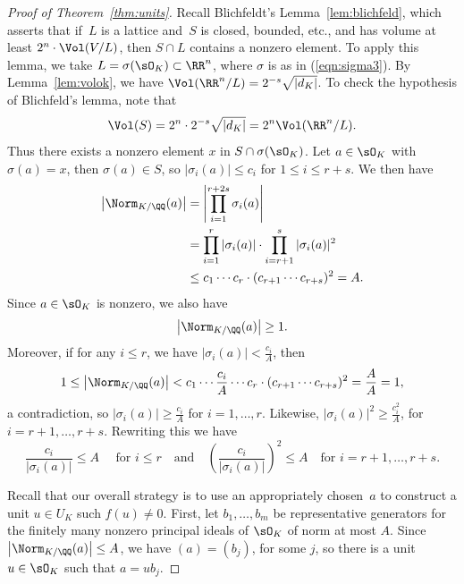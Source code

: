\begin{proof}[Proof of Theorem~\ref{thm:units}]
  Recall Blichfeldt's Lemma~\ref{lem:blichfeld}, which asserts
  that if~$L$ is a lattice and~$S$ is closed, bounded, etc., and has volume
  at least $2^n\cdot \Vol(V/L)$, then $S\cap L$ contains a nonzero element.
  To apply this lemma, we take $L=\sigma(\sO_K)\subset \RR^n$, where $\sigma$
  is as in (\ref{eqn:sigma3}). By Lemma~\ref{lem:volok}, we have
  $\Vol(\RR^n/L) = 2^{-s}\sqrt{|d_K|}$. To check the hypothesis of
  Blichfeld's lemma, note that
  \[
    \Vol(S) = 2^n \cdot 2^{-s} \sqrt{|d_K|} = 2^n \Vol(\RR^n/L).
  \]
  Thus there exists a nonzero element $x$ in $S\cap \sigma(\sO_K)$.
  Let $a\in \sO_K$ with $\sigma(a)=x$, then $\sigma(a)\in S$, so
  $|\sigma_i(a)|\leq c_i$ for $1\leq i\leq r+s$. We then have
  \begin{align*}
    \left|\Norm_{K/\QQ}(a)\right|
    &= \left|\prod_{i=1}^{r+2s} \sigma_i(a)\right|
    \\
    &= \prod_{i=1}^r |\sigma_i(a)|\cdot \prod_{i=r+1}^s|\sigma_i(a)|^2
    \\
    &\leq c_1\cdots c_r\cdot (c_{r+1}\cdots c_{r+s})^2 = A.
  \end{align*}
  Since $a\in \sO_K$ is nonzero, we also have
  \[
    \left|\Norm_{K/\QQ}(a)\right|\geq 1.
  \]
  Moreover, if for any $i\leq r$, we have $|\sigma_i(a)|< \frac{c_i}{A}$, then
  \[
    1
    \leq \left|\Norm_{K/\QQ}(a)\right|
    < c_1\cdots \frac{c_i}{A}\cdots c_r \cdot (c_{r+1}\cdots c_{r+s})^2
    = \frac{A}{A} = 1,
  \]
  a contradiction, so $|\sigma_i(a)|\geq \frac{c_i}{A}$ for $i=1,\dots, r$.
  Likewise, $|\sigma_i(a)|^2 \geq \frac{c_i^2}{A}$, for $i=r+1,\dots, r+s$.
  Rewriting this we have
  \begin{equation}\label{eqn:cisigbound}
    \frac{c_i}{|\sigma_i(a)|}\leq A\quad\text{ for }i\leq r
    \quad\text{and}\quad
    \left(\frac{c_i}{|\sigma_i(a)|}\right)^2
    \leq A\quad\text{for } i=r+1,\dots, r+s.
  \end{equation}
  
  Recall that our overall strategy is to use an appropriately chosen~$a$
  to construct a unit $u\in U_K$ such $f(u)\neq 0$.  First, let
  $b_1,\dots, b_m$ be representative generators for the finitely many
  nonzero principal ideals of $\sO_K$ of norm at most $A$.  Since
  $\left|\Norm_{K/\QQ}(a)\right|\leq A$, we have $(a)=(b_j)$, for some $j$, so there
  is a unit~$u\in \sO_K$ such that $a=u b_j$.
  

\end{proof}
